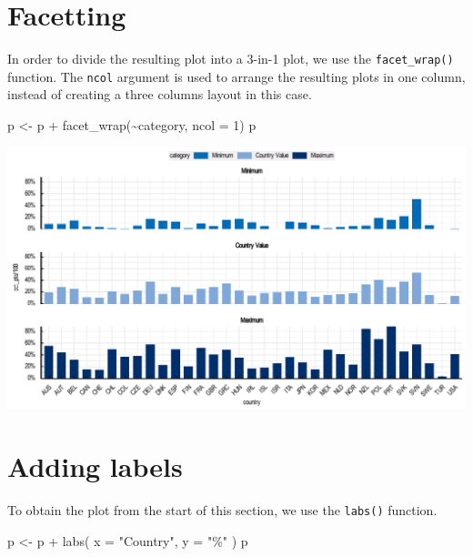 \documentclass[
  11pt,
  oneside]{report}
\newenvironment{Shaded}{\begin{snugshade}}{\end{snugshade}}
\newcommand{\AttributeTok}[1]{\textcolor[rgb]{0.77,0.63,0.00}{#1}}
\newcommand{\DecValTok}[1]{\textcolor[rgb]{0.00,0.00,0.81}{#1}}
\newcommand{\FunctionTok}[1]{\textcolor[rgb]{0.00,0.00,0.00}{#1}}
\newcommand{\NormalTok}[1]{#1}
\newcommand{\OtherTok}[1]{\textcolor[rgb]{0.56,0.35,0.01}{#1}}
\newcommand{\SpecialCharTok}[1]{\textcolor[rgb]{0.00,0.00,0.00}{#1}}
\newcommand{\StringTok}[1]{\textcolor[rgb]{0.31,0.60,0.02}{#1}}
\begin{document}
\hypertarget{facetting}{%
\section{Facetting}\label{facetting}}

In order to divide the resulting plot into a 3-in-1 plot, we use the
\texttt{facet\_wrap()} function. The \texttt{ncol} argument is used to
arrange the resulting plots in one column, instead of creating a three
columns layout in this case.

\begin{Shaded}
\begin{Highlighting}[]
\NormalTok{p }\OtherTok{\textless{}{-}}\NormalTok{ p }\SpecialCharTok{+}
  \FunctionTok{facet\_wrap}\NormalTok{(}\SpecialCharTok{\textasciitilde{}}\NormalTok{category, }\AttributeTok{ncol =} \DecValTok{1}\NormalTok{)}
\NormalTok{p}
\end{Highlighting}
\end{Shaded}

\begin{center}\includegraphics{book_figures/bar_5-1} \end{center}

\hypertarget{adding-labels}{%
\section{Adding labels}\label{adding-labels}}

To obtain the plot from the start of this section, we use the
\texttt{labs()} function.

\begin{Shaded}
\begin{Highlighting}[]
\NormalTok{p }\OtherTok{\textless{}{-}}\NormalTok{ p }\SpecialCharTok{+}
  \FunctionTok{labs}\NormalTok{(}
    \AttributeTok{x =} \StringTok{"Country"}\NormalTok{,}
    \AttributeTok{y =} \StringTok{"\%"}
\NormalTok{  )}
\NormalTok{p}
\end{Highlighting}
\end{Shaded}
\end{document}
